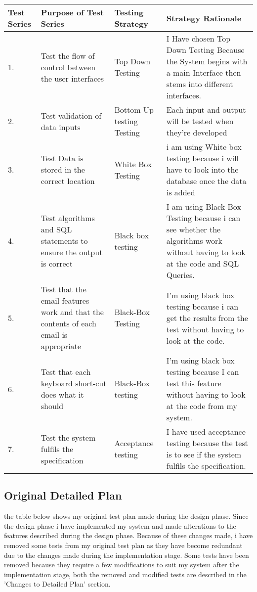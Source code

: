 \begin{landscape}
\begin{center}
\begin{tabular}{|p{2cm}|p{5cm}|p{5cm}|p{4cm}|}
	 \textbf{Test Series} & \textbf{Purpose of Test Series} & \textbf{Testing Strategy} & \textbf{Strategy Rationale}\\ \hline
	1. & Test the flow of control between the user interfaces & Top Down Testing & I Have chosen Top Down Testing Because the System begins with a main Interface then stems into different interfaces. \\ \hline
	2. & Test validation of data inputs & Bottom Up testing Testing &  Each input and output will be tested when they're developed\\ \hline
	\rowcolor{dark-grey} 3. & Test Data is stored in the correct location & White Box Testing & i am using White box testing because i will have to look into the database once the data is added \\ \hline
	4. & Test algorithms and SQL statements to ensure the output is correct & Black box testing & I am using Black Box Testing because i can see whether the algorithms work without having to look at the code and SQL Queries. \\ \hline
	\rowcolor{light-grey} 5. & Test that the email features work and that the contents of each email is appropriate & Black-Box Testing & I'm using black box testing because i can get the results from the test without having to look at the code.\\ \hline
	\rowcolor{light-grey} 6. & Test that each keyboard short-cut does what it should & Black-Box testing & I'm using black box testing because I can test this feature without having to look at the code from my system. \\ \hline
	7. & Test the system fulfils the specification & Acceptance testing & I have used acceptance testing because the test is to see if the system fulfils the specification. \\ \hline

    \end{tabular}
\end{center}

\subsection{Original Detailed Plan}

the table below shows my original test plan made during the design phase. Since the design phase i have implemented my system and made alterations to the features described during the design phase. Because of these changes made, i have removed some tests from my original test plan as they have become redundant due to the changes made during the implementation stage. Some tests have been removed because they require a few modifications to suit my system after the implementation stage, both the removed and modified tests are described in the 'Changes to Detailed Plan' section. 


\end{landscape}
